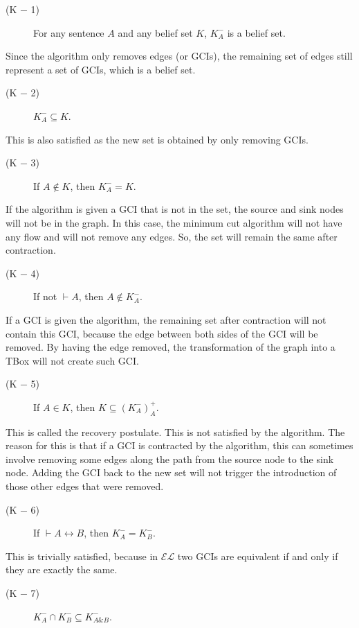 \documentclass{sfuthesis}
\theoremstyle{plain}
\theoremstyle{definition}
\begin{document}
\begin{description}
\item[(K $-$ 1)] For any sentence $A$ and any belief set $K$, $K^{-}_{A}$ is a belief set.
\end{description}
Since the algorithm only removes edges (or GCIs), the remaining set of edges still represent a set of GCIs, which is a belief set.
\begin{description}
\item[(K $-$ 2)] $K^{-}_{A} \subseteq K$. 
\end{description}
This is also satisfied as the new set is obtained by only removing GCIs.
\begin{description}
\item[(K $-$ 3)] If $A \notin K$, then $K^{-}_{A} = K$. 
\end{description}
If the algorithm is given a GCI that is not in the set, the source and sink nodes will not be in the graph. In this case, the minimum cut algorithm will not have any flow and will not remove any edges. So, the set will remain the same after contraction.
\begin{description}
\item[(K $-$ 4)] If not $\vdash A$, then $A \notin K^{-}_{A}$. 
\end{description}
If a GCI is given the algorithm, the remaining set after contraction will not contain this GCI, because the edge between both sides of the GCI will be removed. By having the edge removed, the transformation of the graph into a TBox will not create such GCI.
\begin{description}
\item[(K $-$ 5)] If $A \in K$, then $K \subseteq (K^{-}_{A})^{+}_{A}$.
\end{description}
This is called the recovery postulate. This is not satisfied by the algorithm. The reason for this is that if a GCI is contracted by the algorithm, this can sometimes involve removing some edges along the path from the source node to the sink node. Adding the GCI back to the new set will not trigger the introduction of those other edges that were removed.
\begin{description}
\item[(K $-$ 6)] If $\vdash A \leftrightarrow B$, then $K^{-}_{A} = K^{-}_{B}$.
\end{description}
This is trivially satisfied, because in $\mathcal{EL}$ two GCIs are equivalent if and only if they are exactly the same.
\begin{description}
\item[(K $-$ 7)] $K^{-}_{A} \cap K^{-}_{B} \subseteq K^{-}_{A \& B}$.
\end{description}
\end{document}
